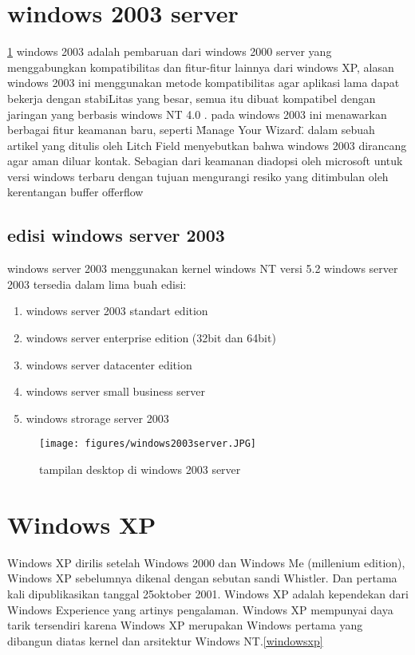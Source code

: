 \begin{enumerate}
\section{windows 2003 server}
\ref{windows2003server}
	windows 2003 adalah pembaruan dari windows 2000 server yang menggabungkan kompatibilitas dan fitur-fitur lainnya dari windows XP, alasan windows 2003 ini menggunakan metode kompatibilitas agar aplikasi lama dapat bekerja dengan stabiLitas yang besar, semua itu dibuat kompatibel dengan jaringan yang berbasis windows NT 4.0 . pada windows 2003 ini menawarkan berbagai fitur keamanan baru, seperti \"Manage Your Wizard\".
	dalam sebuah artikel yang ditulis oleh Litch Field menyebutkan bahwa windows 2003 dirancang agar aman diluar kontak. Sebagian dari keamanan diadopsi oleh microsoft untuk versi windows terbaru dengan tujuan mengurangi resiko yang ditimbulan oleh kerentangan buffer offerflow \cite{litchfield2003defeating}
	\subsection{edisi windows server 2003}
		windows server 2003 menggunakan kernel windows NT versi 5.2 
		windows server 2003 tersedia dalam lima buah edisi:
\begin{enumerate}
		\item windows server 2003 standart edition
 		\item windows server enterprise edition (32bit dan 64bit)
		\item windows server datacenter edition
		\item windows server small business server
		\item windows strorage server 2003
\end{enumerate}

\begin{figure}[ht]
\centerline{\texttt{[image: figures/windows2003server.JPG]}}
\caption{tampilan desktop di windows 2003 server}
\label{windows2003server}
\end{figure}
	\section{Windows XP}
		Windows XP dirilis setelah Windows 2000 dan Windows Me (millenium edition), Windows XP sebelumnya dikenal dengan sebutan sandi Whistler. Dan pertama kali dipublikasikan tanggal 25oktober 2001. Windows XP adalah kependekan dari Windows Experience yang artinys pengalaman. Windows XP mempunyai daya tarik tersendiri karena Windows XP merupakan Windows pertama yang dibangun diatas kernel dan arsitektur Windows NT.\cite{pogue2002windows}\ref{windowsxp}

\end{enumerate}
